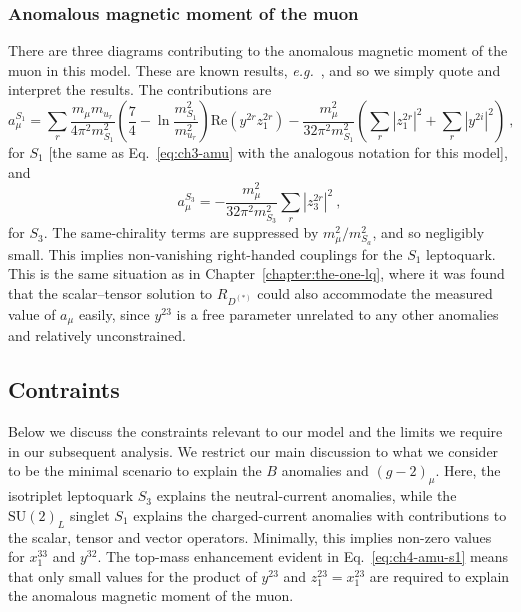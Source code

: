 \subsubsection{Anomalous magnetic moment of the muon}

There are three diagrams contributing to the anomalous magnetic moment of the
muon in this model. These are known results, \textit{e.g.}~\cite{Bauer:2015knc,
  Dorsner:2016wpm}, and so we simply quote and interpret the results. The
contributions are
\begin{equation}
  \label{eq:ch4-amu-s1}
a_\mu^{S_{1}} = \sum_r \frac{m_\mu m_{u_r}}{4\pi^2 m_{S_{1}}^2} \left( \frac{7}{4} - \ln\frac{m_{S_{1}}^2}{m_{u_r}^2}\right) \text{Re} (y^{2r} z_{1}^{2r}) - \frac{m_\mu^2}{32\pi^2 m_{S_{1}}^2} \left(\sum_r |z^{2r}_{1}|^2+ \sum_r |y^{2i}|^2 \right) \ ,
\end{equation}
for $S_{1}$ [the same as Eq.~\eqref{eq:ch3-amu} with the analogous notation for
this model], and
\begin{equation}
a_\mu^{S_{3}} =  - \frac{m_\mu^2}{32\pi^2 m_{S_{3}}^2} \sum_r |z^{2r}_{3}|^2 \ ,
\end{equation}
for $S_{3}$. The same-chirality terms are suppressed by
$m_{\mu}^{2} / m_{S_{a}}^{2}$, and so negligibly small. This implies
non-vanishing right-handed couplings for the $S_{1}$ leptoquark. This is the
same situation as in Chapter~\ref{chapter:the-one-lq}, where it was found that
the scalar--tensor solution to $R_{D^{(*)}}$ could also accommodate the measured
value of $a_{\mu}$ easily, since $y^{23}$ is a free parameter unrelated to any
other anomalies and relatively unconstrained.

\subsection{Contraints}
\label{sec:ch4-innes-constraints}

Below we discuss the constraints relevant to our model and the limits we require
in our subsequent analysis. We restrict our main discussion to what we consider
to be the minimal scenario to explain the $B$ anomalies and $(g-2)_\mu$. Here,
the isotriplet leptoquark $S_{3}$ explains the neutral-current anomalies, while
the $\text{SU}(2)_{L}$ singlet $S_{1}$ explains the charged-current anomalies
with contributions to the scalar, tensor and vector operators. Minimally, this
implies non-zero values for $x_{1}^{33}$ and $y^{32}$. The top-mass enhancement
evident in Eq.~\eqref{eq:ch4-amu-s1} means that only small values for the
product of $y^{23}$ and $z_{1}^{23} = x_{1}^{23}$ are required to explain the
anomalous magnetic moment of the muon.

